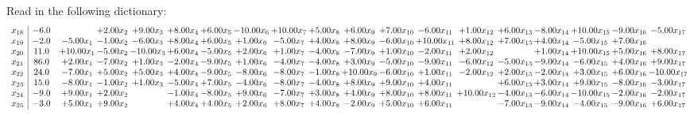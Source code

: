 \documentclass[9pt]{article}
\begin{document}
Read in the following dictionary:
\[\begin{array}{c| c c@{\hskip 2pt} c@{\hskip 2pt} c@{\hskip 2pt} c@{\hskip 2pt} c@{\hskip 2pt} c@{\hskip 2pt} c@{\hskip 2pt} c@{\hskip 2pt} c@{\hskip 2pt} c@{\hskip 2pt} c@{\hskip 2pt} c@{\hskip 2pt} c@{\hskip 2pt} c@{\hskip 2pt} c@{\hskip 2pt} c@{\hskip 2pt} c@{\hskip 2pt} }
 x_{18}   &  -6.0  &   & +  2.00 x_{2} & +  9.00 x_{3} & +  8.00 x_{4} & +  6.00 x_{5} & -10.00 x_{6} & + 10.00 x_{7} & +  5.00 x_{8} & +  6.00 x_{9} & +  7.00 x_{10} & -6.00 x_{11} & +  1.00 x_{12} & +  6.00 x_{13} & -8.00 x_{14} & + 10.00 x_{15} & -9.00 x_{16} & -5.00 x_{17}\\
 x_{19}   &  -2.0 & -5.00 x_{1} & -1.00 x_{2} & -6.00 x_{3} & +  8.00 x_{4} & +  6.00 x_{5} & +  1.00 x_{6} & -5.00 x_{7} & +  4.00 x_{8} & +  8.00 x_{9} & -6.00 x_{10} & + 10.00 x_{11} & +  8.00 x_{12} & +  7.00 x_{13} & +  4.00 x_{14} & -5.00 x_{15} & +  7.00 x_{16} &   \\
 x_{20}   &  11.0 & + 10.00 x_{1} & -5.00 x_{2} & -10.00 x_{3} & +  6.00 x_{4} & -5.00 x_{5} & +  2.00 x_{6} & +  1.00 x_{7} & -4.00 x_{8} & -7.00 x_{9} & +  1.00 x_{10} & -2.00 x_{11} & +  2.00 x_{12} &   & +  1.00 x_{14} & + 10.00 x_{15} & +  5.00 x_{16} & +  8.00 x_{17}\\
 x_{21}   &  86.0 & +  2.00 x_{1} & -7.00 x_{2} & +  1.00 x_{3} & -2.00 x_{4} & -9.00 x_{5} & +  1.00 x_{6} & -4.00 x_{7} & -4.00 x_{8} & +  3.00 x_{9} & -5.00 x_{10} & -9.00 x_{11} & -6.00 x_{12} & -5.00 x_{13} & -9.00 x_{14} & -6.00 x_{15} & +  4.00 x_{16} & +  9.00 x_{17}\\
 x_{22}   &  24.0 & -7.00 x_{1} & +  5.00 x_{2} & +  5.00 x_{3} & +  4.00 x_{4} & -9.00 x_{5} & -8.00 x_{6} & -8.00 x_{7} & -1.00 x_{8} & + 10.00 x_{9} & -6.00 x_{10} & +  1.00 x_{11} & -2.00 x_{12} & +  2.00 x_{13} & -2.00 x_{14} & +  3.00 x_{15} & +  6.00 x_{16} & -10.00 x_{17}\\
 x_{23}   &  15.0 & -8.00 x_{1} & -1.00 x_{2} & +  1.00 x_{3} & -5.00 x_{4} & +  7.00 x_{5} & -4.00 x_{6} & -8.00 x_{7} & -4.00 x_{8} & +  8.00 x_{9} & +  9.00 x_{10} & +  4.00 x_{11} &   & +  6.00 x_{13} & +  3.00 x_{14} & +  9.00 x_{15} & -8.00 x_{16} & -3.00 x_{17}\\
 x_{24}   &  -9.0 & +  9.00 x_{1} & +  2.00 x_{2} &   & -1.00 x_{4} & -8.00 x_{5} & +  9.00 x_{6} & -7.00 x_{7} & +  3.00 x_{8} & +  4.00 x_{9} & +  8.00 x_{10} & +  8.00 x_{11} & + 10.00 x_{12} & -4.00 x_{13} & -6.00 x_{14} & -10.00 x_{15} & -2.00 x_{16} & -2.00 x_{17}\\
 x_{25}   &  -3.0 & +  5.00 x_{1} & +  9.00 x_{2} &   & +  4.00 x_{4} & +  4.00 x_{5} & +  2.00 x_{6} & +  8.00 x_{7} & +  4.00 x_{8} & -2.00 x_{9} & +  5.00 x_{10} & +  6.00 x_{11} &   & -7.00 x_{13} & -9.00 x_{14} & -4.00 x_{15} & -9.00 x_{16} & +  6.00 x_{17}\\

\end{array}\]
\end{document}
